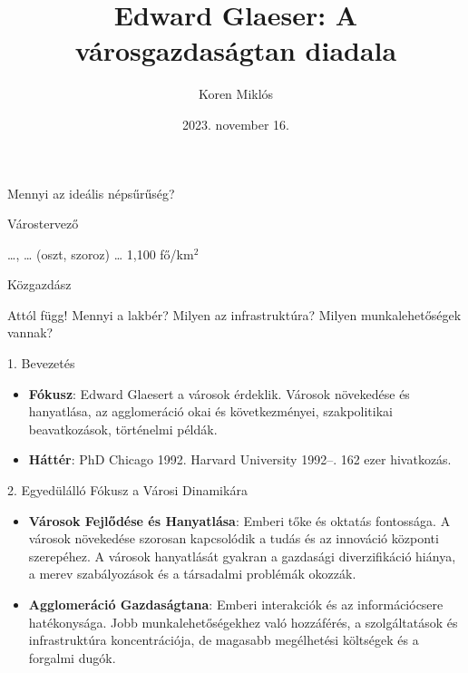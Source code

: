 \documentclass[ignorenonframetext,aspectratio=54,]{beamer}
\title{Edward Glaeser: A városgazdaságtan diadala}
\author{Koren Miklós}
\date{2023. november 16.}
\providecommand{\tightlist}{%
  \setlength{\itemsep}{0pt}\setlength{\parskip}{0pt}}
\begin{document}
\frame{\titlepage}

\begin{frame}{Mennyi az ideális népsűrűség?}
\protect\hypertarget{mennyi-az-ideuxe1lis-nuxe9psux171rux171suxe9g}{}

\pause

\begin{block}{Várostervező}

\ldots{}, \ldots{} (oszt, szoroz) \ldots{} 1,100 fő/km\({}^2\)

\pause

\end{block}

\begin{block}{Közgazdász}

Attól függ! Mennyi a lakbér? Milyen az infrastruktúra? Milyen
munkalehetőségek vannak?

\end{block}

\end{frame}

\begin{frame}{1. Bevezetés}
\protect\hypertarget{bevezetuxe9s}{}

\begin{itemize}
\tightlist
\item
  \textbf{Fókusz}: Edward Glaesert a városok érdeklik. Városok
  növekedése és hanyatlása, az agglomeráció okai és következményei,
  szakpolitikai beavatkozások, történelmi példák.
\item
  \textbf{Háttér}: PhD Chicago 1992. Harvard University 1992--. 162 ezer
  hivatkozás.
\end{itemize}

\end{frame}

\begin{frame}{2. Egyedülálló Fókusz a Városi Dinamikára}
\protect\hypertarget{egyeduxfcluxe1lluxf3-fuxf3kusz-a-vuxe1rosi-dinamikuxe1ra}{}

\begin{itemize}
\tightlist
\item
  \textbf{Városok Fejlődése és Hanyatlása}: Emberi tőke és oktatás
  fontossága. A városok növekedése szorosan kapcsolódik a tudás és az
  innováció központi szerepéhez. A városok hanyatlását gyakran a
  gazdasági diverzifikáció hiánya, a merev szabályozások és a társadalmi
  problémák okozzák.
\item
  \textbf{Agglomeráció Gazdaságtana}: Emberi interakciók és az
  információcsere hatékonysága. Jobb munkalehetőségekhez való
  hozzáférés, a szolgáltatások és infrastruktúra koncentrációja, de
  magasabb megélhetési költségek és a forgalmi dugók.
\end{itemize}

\end{frame}
\end{document}
